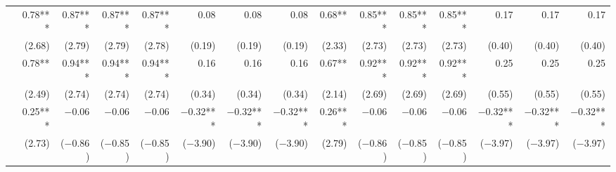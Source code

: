 \begin{tabularx}{1.45\textwidth}{lRRRRRRRRRRRRRR}
		 & \num{0.78}***\phantom{)} & \num{0.87}***\phantom{)} & \num{0.87}***\phantom{)} & \num{0.87}***\phantom{)} & \num{0.08}\phantom{***)} & \num{0.08}\phantom{***)} & \num{0.08}\phantom{***)} & \num{0.68}**\phantom{*)} & \num{0.85}***\phantom{)} & \num{0.85}***\phantom{)} & \num{0.85}***\phantom{)} & \num{0.17}\phantom{***)} & \num{0.17}\phantom{***)} & \num{0.17}\phantom{***)} \\
		 & (\num{2.68})\phantom{***} & (\num{2.79})\phantom{***} & (\num{2.79})\phantom{***} & (\num{2.78})\phantom{***} & (\num{0.19})\phantom{***} & (\num{0.19})\phantom{***} & (\num{0.19})\phantom{***} & (\num{2.33})\phantom{***} & (\num{2.73})\phantom{***} & (\num{2.73})\phantom{***} & (\num{2.73})\phantom{***} & (\num{0.40})\phantom{***} & (\num{0.40})\phantom{***} & (\num{0.40})\phantom{***} \\ [\dspacing]
		 & \num{0.78}**\phantom{*)} & \num{0.94}***\phantom{)} & \num{0.94}***\phantom{)} & \num{0.94}***\phantom{)} & \num{0.16}\phantom{***)} & \num{0.16}\phantom{***)} & \num{0.16}\phantom{***)} & \num{0.67}**\phantom{*)} & \num{0.92}***\phantom{)} & \num{0.92}***\phantom{)} & \num{0.92}***\phantom{)} & \num{0.25}\phantom{***)} & \num{0.25}\phantom{***)} & \num{0.25}\phantom{***)} \\
		 & (\num{2.49})\phantom{***} & (\num{2.74})\phantom{***} & (\num{2.74})\phantom{***} & (\num{2.74})\phantom{***} & (\num{0.34})\phantom{***} & (\num{0.34})\phantom{***} & (\num{0.34})\phantom{***} & (\num{2.14})\phantom{***} & (\num{2.69})\phantom{***} & (\num{2.69})\phantom{***} & (\num{2.69})\phantom{***} & (\num{0.55})\phantom{***} & (\num{0.55})\phantom{***} & (\num{0.55})\phantom{***} \\ [\dspacing]
		 & \num{0.25}***\phantom{)} & \num{-0.06}\phantom{***)} & \num{-0.06}\phantom{***)} & \num{-0.06}\phantom{***)} & \num{-0.32}***\phantom{)} & \num{-0.32}***\phantom{)} & \num{-0.32}***\phantom{)} & \num{0.26}***\phantom{)} & \num{-0.06}\phantom{***)} & \num{-0.06}\phantom{***)} & \num{-0.06}\phantom{***)} & \num{-0.32}***\phantom{)} & \num{-0.32}***\phantom{)} & \num{-0.32}***\phantom{)} \\
		 & (\num{2.73})\phantom{***} & (\num{-0.86})\phantom{***} & (\num{-0.85})\phantom{***} & (\num{-0.85})\phantom{***} & (\num{-3.90})\phantom{***} & (\num{-3.90})\phantom{***} & (\num{-3.90})\phantom{***} & (\num{2.79})\phantom{***} & (\num{-0.86})\phantom{***} & (\num{-0.85})\phantom{***} & (\num{-0.85})\phantom{***} & (\num{-3.97})\phantom{***} & (\num{-3.97})\phantom{***} & (\num{-3.97})\phantom{***} \\ [\dspacing]


\end{tabularx}
